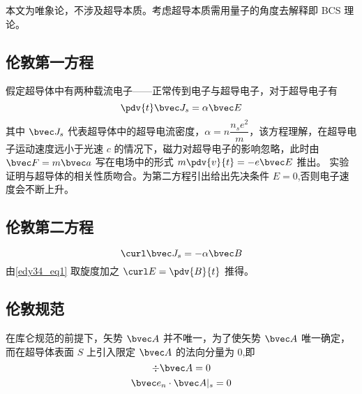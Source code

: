 

本文为唯象论，不涉及超导本质。考虑超导本质需用量子的角度去解释即 BCS 理论。
\subsection{伦敦第一方程}
假定超导体中有两种载流电子——正常传到电子与超导电子，对于超导电子有
\begin{equation}
\pdv{t}\bvec J_s=\alpha\bvec E \label{edy34_eq1}
\end{equation}
其中 $\bvec J_s$ 代表超导体中的超导电流密度，$\alpha=n\dfrac {n_se^2}m$，该方程理解，在超导电子运动速度远小于光速 $c$ 的情况下，磁力对超导电子的影响忽略，此时由 $\bvec F=m \bvec a$ 写在电场中的形式 $m\pdv{v}{t}=-e\bvec E$ 推出。
实验证明与超导体的相关性质吻合。为第二方程引出给出先决条件 $E=0$,否则电子速度会不断上升。
\subsection{伦敦第二方程}
\begin{equation}
\curl\bvec J_s=-\alpha\bvec B \label{edy34_eq2}
\end{equation}
由\autoref{edy34_eq1} 取旋度加之 $\curl E=\pdv{B}{t}$ 推得。
\subsection{伦敦规范}
在库仑规范的前提下，矢势 $\bvec A$ 并不唯一，为了使矢势 $\bvec A$ 唯一确定，而在超导体表面 $S$ 上引入限定 $\bvec A$ 的法向分量为 $0$,即
\begin{equation}
\div \bvec A=0
\end{equation}
\begin{equation}
\bvec e_n \cdot \bvec A|_s=0
\end{equation}
